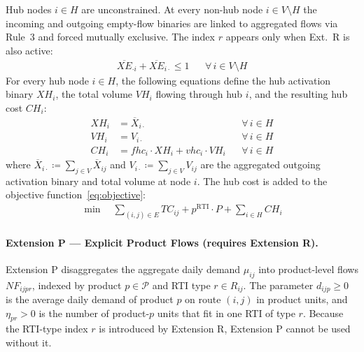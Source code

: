 Hub nodes $i\in H$ are unconstrained. At every non-hub node
$i\in V\setminus H$ the incoming and outgoing empty-flow binaries are linked
to aggregated flows via Rule~3 and forced mutually exclusive. The index $r$
appears only when Ext.~R is also active:
%
\begin{align}
  \overline{XE}_{\cdot i} + \overline{XE}_{i \cdot} \leq 1
  && \forall\,i\in V\setminus H
  \label{eq:ext-h-excl}
\end{align}
%
{For every hub node $i \in H$, the following equations define
the hub activation binary $XH_i$, the total volume $VH_i$ flowing through
hub $i$, and the resulting hub cost $CH_i$:}
%
\begin{align}
  XH_i &= \overline{X}_{i\cdot}
  && {\forall\,i\in H}
  \label{eq:ext-h-XH} \\[4pt]
  VH_i &= V_{i\cdot}
  && {\forall\,i\in H}
  \label{eq:ext-h-VH} \\[4pt]
  CH_{i} &= fhc_{i}\cdot XH_i + vhc_i \cdot VH_i
  && {\forall\,i\in H}
  \label{eq:ext-h-CH}
\end{align}
%
{where $\overline{X}_{i\cdot} \coloneqq \sum_{j\in V}
\overline{X}_{ij}$ and $V_{i\cdot} \coloneqq \sum_{j\in V} V_{ij}$ are the
aggregated outgoing activation binary and total volume at node $i$.
The hub cost is added to the objective function~\eqref{eq:objective}:}
%
\begin{align}
  \min \quad
  \sum_{(i,j)\in E} TC_{ij}
  + p^{\text{RTI}} \cdot P
  + {\sum_{i\in H} CH_i}
  \label{eq:objective-H}
\end{align}

\paragraph{Extension P --- Explicit Product Flows
  {(requires Extension R)}.}
%
{Extension P disaggregates the aggregate daily demand
$\mu_{ij}$ into product-level flows $NF_{ijpr}$, indexed by product
$p \in \mathcal{P}$ and RTI type $r \in R_{ij}$.  The parameter
$d_{ijp} \geq 0$ is the average daily demand of product $p$ on route $(i,j)$
in product units, and $\eta_{pr} > 0$ is the number of product-$p$ units
that fit in one RTI of type $r$.  Because the RTI-type index $r$ is
introduced by Extension R, Extension P cannot be used without it.}

